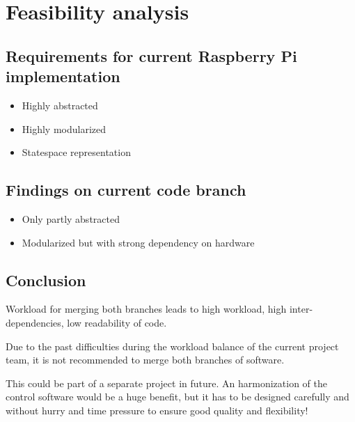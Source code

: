 \chapter{Feasibility analysis}
\label{sec:feasibility}

\section{Requirements for current Raspberry Pi implementation}
\label{sec:feasibility:reqRasp}
\begin{itemize}
	\item Highly abstracted
	\item Highly modularized
	\item Statespace representation
\end{itemize}

\section{Findings on current code branch}
\label{sec:feasibility:fingings}
\begin{itemize}
	\item Only partly abstracted
	\item Modularized but with strong dependency on hardware
\end{itemize}

\section{Conclusion}
\label{sec:feasibility:conclusion}
Workload for merging both branches leads to high workload, high inter-dependencies, low readability of code.

Due to the past difficulties during the workload balance of the current project team, it is not recommended to merge both branches of software.

This could be part of a separate project in future. An harmonization of the control software would be a huge benefit, but it has to be designed carefully and without hurry and time pressure to ensure good quality and flexibility!